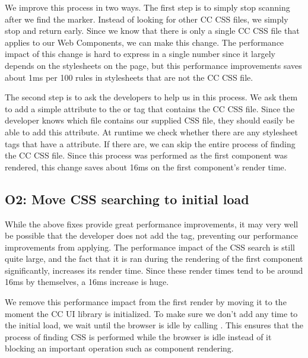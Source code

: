 We improve this process in two ways. The first step is to simply stop scanning after we find the marker. Instead of looking for other CC CSS files, we simply stop and return early. Since we know that there is only a single CC CSS file that applies to our Web Components, we can make this change. The performance impact of this change is hard to express in a single number since it largely depends on the stylesheets on the page, but this performance improvements saves about 1ms per 100 rules in stylesheets that are not the CC CSS file.

The second step is to ask the developers to help us in this process. We ask them to add a simple  attribute to the  or  tag that contains the CC CSS file. Since the developer knows which file contains our supplied CSS file, they should easily be able to add this attribute. At runtime we check whether there are any stylesheet tags that have a  attribute. If there are, we can skip the entire process of finding the CC CSS file. Since this process was performed as the first component was rendered, this change saves about 16ms on the first component's render time.

\subsection{O2: Move CSS searching to initial load}\label{sec:case-study:css-initial-load}
While the above fixes provide great performance improvements, it may very well be possible that the developer does not add the  tag, preventing our performance improvements from applying. The performance impact of the CSS search is still quite large, and the fact that it is ran during the rendering of the first component significantly, increases its render time. Since these render times tend to be around 16ms by themselves, a 16ms increase is huge.

We remove this performance impact from the first render by moving it to the moment the CC UI library is initialized. To make sure we don't add any time to the initial load, we wait until the browser is idle by calling . This ensures that the process of finding CSS is performed while the browser is idle instead of it blocking an important operation such as component rendering.
